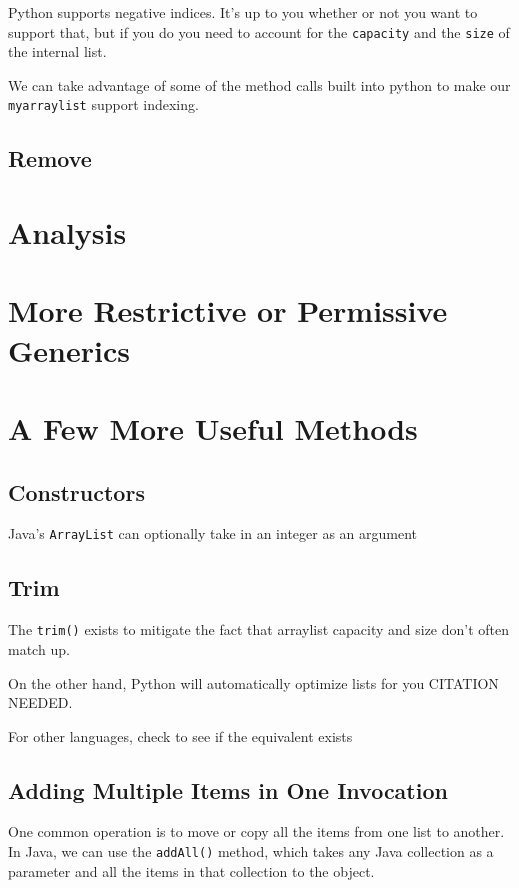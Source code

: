 Python supports negative indices.  It's up to you whether or not you want to support that, but if you do you need to account for the \texttt{capacity} and the \texttt{size} of the internal list.


We can take advantage of some of the method calls built into python to make our \texttt{myarraylist} support indexing.


\subsection{Remove}




\section{Analysis}

\section{More Restrictive or Permissive Generics}

\section{A Few More Useful Methods}

\subsection{Constructors}
Java's \texttt{ArrayList} can optionally take in an integer as an argument

\subsection{Trim}

The \texttt{trim()} exists to mitigate the fact that arraylist capacity and size don't often match up.


On the other hand, Python will automatically optimize lists for you CITATION NEEDED.

For other languages, check to see if the equivalent exists

\subsection{Adding Multiple Items in One Invocation}
One common operation is to move or copy all the items from one list to another.
In Java, we can use the \texttt{addAll()} method, which takes any Java collection as a parameter and all the items in that collection to the object.

